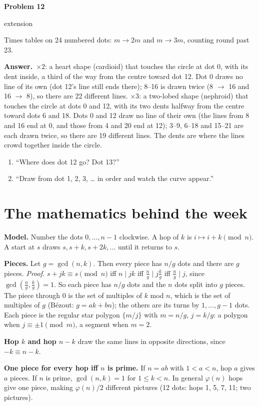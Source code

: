 \documentclass[11pt]{article}
\newcommand{\lbl}[1]{\colorbox{black!10}{\footnotesize\strut #1}}
\newcommand{\ext}{\lbl{extension}}
\newcommand{\pb}[3]{\par\needspace{4\baselineskip}\vspace{3pt}\noindent\textbf{Problem #1}\enspace #2\enspace #3\par}
\newcommand{\ans}{\textbf{Answer.}\ }
\newenvironment{hints}{\begin{enumerate}[label={\textit{Hint \arabic*.}}, leftmargin=*, align=left]}{\end{enumerate}}
\begin{document}
\pb{12}{\ext}{Times tables on 24 numbered dots: $m \to 2m$ and $m \to 3m$, counting round past 23.}
\ans $\times2$: a heart shape (cardioid) that touches the circle at dot 0, with its dent inside, a third of the
way from the centre toward dot 12. Dot 0 draws no line of its own (dot 12's line still ends there); 8--16 is
drawn twice (8 $\to$ 16 and 16 $\to$ 8), so there are 22 different lines. $\times3$: a two-lobed shape
(nephroid) that touches the circle at dots 0 and 12, with its two dents halfway from the centre toward dots 6 and
18. Dots 0 and 12 draw no line of their own (the lines from 8 and 16 end at 0, and those from 4 and 20 end at
12); 3--9, 6--18 and 15--21 are each drawn twice, so there are 19 different lines. The dents are where the
lines crowd together inside the circle.
\begin{hints}
\item ``Where does dot 12 go? Dot 13?''
\item ``Draw from dot 1, 2, 3, \dots{} in order and watch the curve appear.''
\end{hints}

\section{The mathematics behind the week}

\textbf{Model.} Number the dots $0,\dots,n-1$ clockwise. A hop of $k$ is $i \mapsto i+k \pmod n$. A start at $s$
draws $s, s+k, s+2k,\dots$ until it returns to $s$.

\textbf{Pieces.} Let $g=\gcd(n,k)$. Then every piece has $n/g$ dots and there are $g$ pieces.
\emph{Proof.} $s+jk\equiv s \pmod n$ iff $n \mid jk$ iff $\tfrac{n}{g} \mid j\tfrac{k}{g}$ iff $\tfrac{n}{g}\mid j$,
since $\gcd(\tfrac{n}{g},\tfrac{k}{g})=1$. So each piece has $n/g$ dots and the $n$ dots split into $g$ pieces.
The piece through 0 is the set of multiples of $k$ mod $n$, which is the set of multiples of $g$ (Bézout:
$g=ak+bn$); the others are its turns by $1,\dots,g-1$ dots. Each piece is the regular star polygon
$\{m/j\}$ with $m=n/g$, $j=k/g$: a polygon when $j\equiv\pm1 \pmod m$, a segment when $m=2$.

\textbf{Hop $k$ and hop $n-k$} draw the same lines in opposite directions, since $-k\equiv n-k$.

\textbf{One piece for every hop iff $n$ is prime.} If $n=ab$ with $1<a<n$, hop $a$ gives $a$ pieces. If $n$ is
prime, $\gcd(n,k)=1$ for $1\le k<n$. In general $\varphi(n)$ hops give one piece, making $\varphi(n)/2$ different
pictures (12 dots: hops 1, 5, 7, 11; two pictures).
\end{document}
